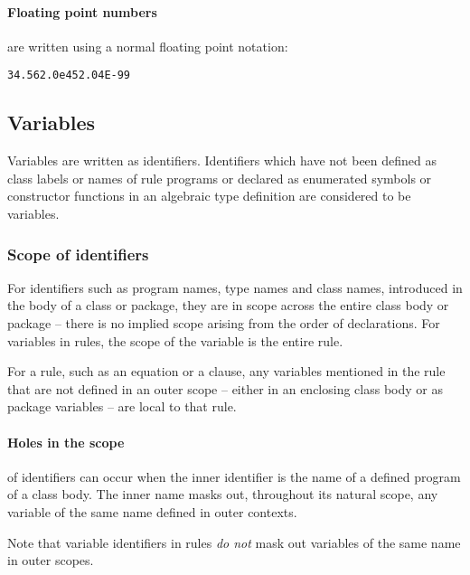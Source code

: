 \paragraph{Floating point numbers}
are written using a normal floating point notation:
\begin{alltt}
34.56 2.0e45 2.04E-99
\end{alltt}

\subsection{Variables}
\label{expression:variable}

Variables are written as identifiers. Identifiers which have not been defined as class labels or names of rule programs or declared as enumerated symbols or constructor functions in an algebraic type definition are considered to be variables.
 
\subsubsection{Scope of identifiers}
\label{variable:scope}

For identifiers such as program names, type names and class names, introduced in the body of a class or package, they are in scope across the entire class body or package -- there is no implied scope arising from the order of declarations. For variables in rules, the scope of the variable is the entire rule.

For a rule, such as an equation or a clause, any variables mentioned in the rule that are not defined in an outer scope -- either in an enclosing class body or as package variables -- are local to that rule.

\paragraph{Holes in the scope}
of identifiers can occur when the inner identifier is the name of a defined program of a class body.  The inner name masks out, throughout its natural scope,  any variable of the same name defined in outer contexts. 

Note that variable identifiers in rules \emph{do not} mask out variables of the same name in outer scopes.

